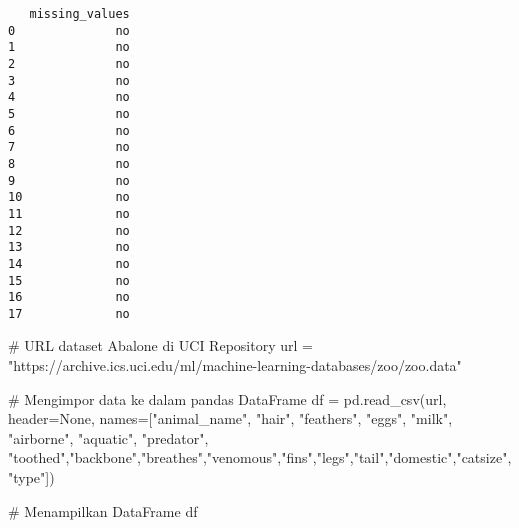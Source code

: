 \documentclass[
  letterpaper,
]{krantz}
\makeatletter
\newenvironment{Shaded}{\begin{snugshade}}{\end{snugshade}}
\newcommand{\CommentTok}[1]{\textcolor[rgb]{0.37,0.37,0.37}{#1}}
\newcommand{\NormalTok}[1]{\textcolor[rgb]{0.00,0.23,0.31}{#1}}
\newcommand{\OperatorTok}[1]{\textcolor[rgb]{0.37,0.37,0.37}{#1}}
\newcommand{\StringTok}[1]{\textcolor[rgb]{0.13,0.47,0.30}{#1}}
\newcommand{\VariableTok}[1]{\textcolor[rgb]{0.07,0.07,0.07}{#1}}
\newenvironment{kframe}{%
\medskip{}
\setlength{\fboxsep}{.8em}
 \def\at@end@of@kframe{}%
 \ifinner\ifhmode%
  \def\at@end@of@kframe{\end{minipage}}%
  \begin{minipage}{\columnwidth}%
 \fi\fi%
 \def\FrameCommand##1{\hskip\@totalleftmargin \hskip-\fboxsep
 \colorbox{shadecolor}{##1}\hskip-\fboxsep
     \hskip-\linewidth \hskip-\@totalleftmargin \hskip\columnwidth}%
 \MakeFramed {\advance\hsize-\width
   \@totalleftmargin\z@ \linewidth\hsize
   \@setminipage}}%
 {\par\unskip\endMakeFramed%
 \at@end@of@kframe}
\renewenvironment{Shaded}{\begin{kframe}}{\end{kframe}}
\makeatother
\begin{document}
\begin{verbatim}
   missing_values  
0              no  
1              no  
2              no  
3              no  
4              no  
5              no  
6              no  
7              no  
8              no  
9              no  
10             no  
11             no  
12             no  
13             no  
14             no  
15             no  
16             no  
17             no  
\end{verbatim}

\begin{Shaded}
\begin{Highlighting}[]
\CommentTok{\# URL dataset Abalone di UCI Repository}
\NormalTok{url }\OperatorTok{=} \StringTok{"https://archive.ics.uci.edu/ml/machine{-}learning{-}databases/zoo/zoo.data"}

\CommentTok{\# Mengimpor data ke dalam pandas DataFrame}
\NormalTok{df }\OperatorTok{=}\NormalTok{ pd.read\_csv(url, header}\OperatorTok{=}\VariableTok{None}\NormalTok{, names}\OperatorTok{=}\NormalTok{[}\StringTok{"animal\_name"}\NormalTok{, }\StringTok{"hair"}\NormalTok{, }\StringTok{"feathers"}\NormalTok{, }\StringTok{"eggs"}\NormalTok{, }\StringTok{"milk"}\NormalTok{, }\StringTok{"airborne"}\NormalTok{, }\StringTok{"aquatic"}\NormalTok{, }\StringTok{"predator"}\NormalTok{, }\StringTok{"toothed"}\NormalTok{,}\StringTok{"backbone"}\NormalTok{,}\StringTok{"breathes"}\NormalTok{,}\StringTok{"venomous"}\NormalTok{,}\StringTok{"fins"}\NormalTok{,}\StringTok{"legs"}\NormalTok{,}\StringTok{"tail"}\NormalTok{,}\StringTok{"domestic"}\NormalTok{,}\StringTok{"catsize"}\NormalTok{,}\StringTok{"type"}\NormalTok{])}

\CommentTok{\# Menampilkan DataFrame}
\NormalTok{df}
\end{Highlighting}
\end{Shaded}
\end{document}
